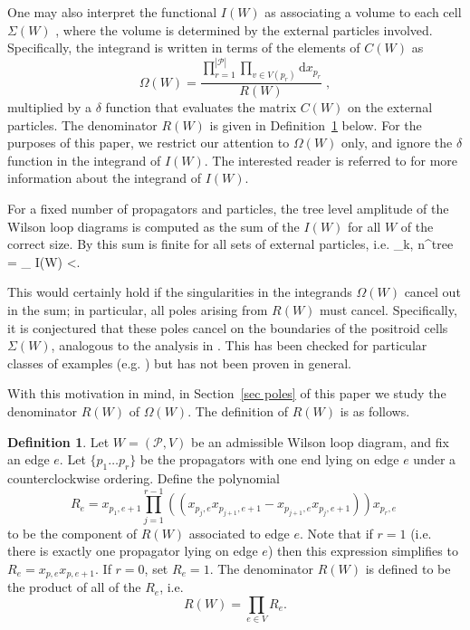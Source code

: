 \documentclass[11pt]{article}
\def\bas #1\eas{\begin{align*} #1 \end{align*}}
\newcommand{\cP}{\mathcal{P}}
\theoremstyle{remark}
\theoremstyle{definition}
\newtheorem{dfn}[thm]{Definition}
\begin{document}
One may also interpret the functional $I(W)$ as associating a volume to each cell $\Sigma(W)$ \cite{wilsonloop, Amplituhedronsquared, HeslopStewart}, where the volume is determined by the external particles involved. Specifically, the integrand is written in terms of the elements of $C(W)$ as  \begin{equation} \label{eq:omega(W) def}\Omega(W) = \frac{\prod_{r=1}^{|\cP|} \prod_{v \in V(p_r)} \textrm{d}x_{p_r}}{R(W)} \;, \end{equation} multiplied by a $\delta$ function that evaluates the matrix $C(W)$ on the external particles. The denominator $R(W)$ is given in Definition~\ref{def R(W)} below. For the purposes of this paper, we restrict our attention to $\Omega(W)$ only, and ignore the $\delta$ function in the integrand of $I(W)$. The interested reader is referred to \cite{Adamo:2012xe,HeslopStewart,LipsteinMason} for more information about the integrand of $I(W)$. 

For a fixed number of propagators and particles, the tree level amplitude of the Wilson loop diagrams is computed as the sum of the $I(W)$ for all $W$ of the correct size. By \cite{Adamo:2011pv,Adamo:2012xe,Arkani-Hamed:2013jha} this sum is finite for all sets of external particles, i.e.
\bas \mathcal{A}_{k, n}^{tree} = \sum_{\substack{W = (\cP, [n]), \\ |\cP| = k}} I(W) <\infty. \eas

This would certainly hold if  the singularities in the integrands $\Omega(W)$ cancel out in the sum; in particular, all poles arising from $R(W)$ must cancel. Specifically, it is conjectured that these poles cancel on the boundaries of the positroid cells $\Sigma(W)$, analogous to the analysis in \cite{Arkani-Hamed:2013jha}. This has been checked for particular classes of examples (e.g. \cite{casestudy, Amplituhedronsquared, HeslopStewart}) but has not been proven in general.

With this motivation in mind, in Section~\ref{sec poles} of this paper we study the denominator $R(W)$ of $\Omega(W)$. The definition of $R(W)$ is as follows.

\begin{dfn}\label{def R(W)}
Let $W = (\cP,V)$ be an admissible Wilson loop diagram, and fix an edge $e$. Let $\{p_1 \ldots p_r\}$ be the propagators with one end lying on edge $e$ under a counterclockwise ordering. Define the polynomial
\[ R_e =  x_{p_1,e+1} \prod_{j= 1}^{r-1} \left((x_{p_j,e} x_{p_{j+1},e+1} - x_{p_{j+1},e} x_{p_{j},e+1} ) \right) x_{p_r,e}\;\]
to be the component of $R(W)$ associated to edge $e$. Note that if $r = 1$ (i.e. there is exactly one propagator lying on edge $e$) then this expression simplifies to $R_e = x_{p,e} x_{p,e+1}$. If $r=0$, set $R_e = 1$. The denominator $R(W)$ is defined to be the product of all of the $R_e$, i.e. 
\[R(W) = \prod_{e \in V} R_e.\]
\end{dfn}
\end{document}
